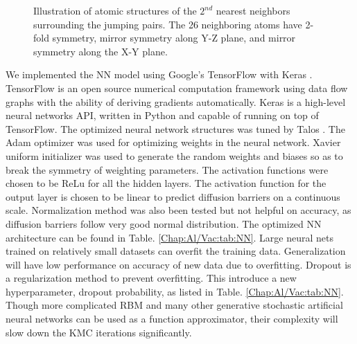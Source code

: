 \begingroup
\begin{figure}[!ht]
  \centering
\caption[Illustration of atomic structures of the $\text{2}^{nd}$ nearest neighbors surrounding the jumping pairs.]{Illustration of atomic structures of the $\text{2}^{nd}$ nearest neighbors surrounding the jumping pairs. The 26 neighboring atoms have 2-fold symmetry, mirror symmetry along Y-Z plane, and mirror symmetry along the X-Y plane.}
\label{Chap:Al/Vac:fig:2nn}
\end{figure}
\endgroup


We implemented the \ac{NN} model using Google's TensorFlow \cite{abadi2016tensorflow} with Keras \cite{chollet2015keras}. TensorFlow is an open source numerical computation framework using data flow graphs with the ability of deriving gradients automatically. Keras is a high-level neural networks API, written in Python and capable of running on top of TensorFlow. The optimized neural network structures was tuned by Talos \cite{Autonomio2019Talos}. The Adam optimizer \cite{kingma2014adam} was used for optimizing weights in the neural network. Xavier uniform initializer \cite{glorot2010understanding} was used to generate the random weights and biases so as to break the symmetry of weighting parameters. The activation functions were chosen to be \acf{ReLu} for all the hidden layers. The activation function for the output layer is chosen to be linear to predict diffusion barriers on a continuous scale. Normalization method was also been tested but not helpful on accuracy, as diffusion barriers follow very good normal distribution.  The optimized \ac{NN} architecture can be found in Table. \ref{Chap:Al/Vac:tab:NN}. Large neural nets trained on relatively small datasets can overfit the training data. Generalization will have low performance on accuracy of new data due to overfitting. Dropout is a regularization method to prevent overfitting. This introduce a new hyperparameter, dropout probability, as listed in Table. \ref{Chap:Al/Vac:tab:NN}. Though more complicated \acf{RBM} and many other generative stochastic artificial neural networks can be used as a function approximator, their complexity will slow down the \ac{KMC} iterations significantly.


